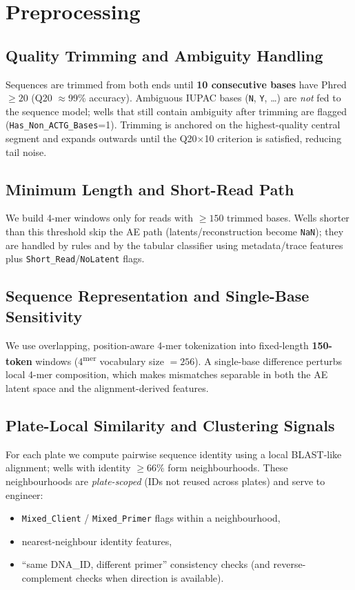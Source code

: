 \section{Preprocessing}
\label{sec:preproc}

\subsection{Quality Trimming and Ambiguity Handling}
Sequences are trimmed from both ends until \textbf{10 consecutive bases} have Phred $\geq 20$ (Q20 $\approx$99\% accuracy). Ambiguous IUPAC bases (\texttt{N}, \texttt{Y}, \ldots) are \emph{not} fed to the sequence model; wells that still contain ambiguity after trimming are flagged (\texttt{Has\_Non\_ACTG\_Bases}=1). Trimming is anchored on the highest-quality central segment and expands outwards until the Q20$\times$10 criterion is satisfied, reducing tail noise.

\subsection{Minimum Length and Short-Read Path}
We build 4-mer windows only for reads with $\geq 150$ trimmed bases. Wells shorter than this threshold skip the AE path (latents/reconstruction become \texttt{NaN}); they are handled by rules and by the tabular classifier using metadata/trace features plus \texttt{Short\_Read}/\texttt{NoLatent} flags.

\subsection{Sequence Representation and Single-Base Sensitivity}
We use overlapping, position-aware 4-mer tokenization into fixed-length \textbf{150-token} windows (4\textsuperscript{mer} vocabulary size $=256$). A single-base difference perturbs local 4-mer composition, which makes mismatches separable in both the AE latent space and the alignment-derived features.

\subsection{Plate-Local Similarity and Clustering Signals}
For each plate we compute pairwise sequence identity using a local BLAST-like alignment; wells with identity $\geq 66\%$ form neighbourhoods. These neighbourhoods are \emph{plate-scoped} (IDs not reused across plates) and serve to engineer:
\begin{itemize}
  \item \texttt{Mixed\_Client} / \texttt{Mixed\_Primer} flags within a neighbourhood,
  \item nearest-neighbour identity features,
  \item ``same DNA\_ID, different primer'' consistency checks (and reverse-complement checks when direction is available).
\end{itemize}

